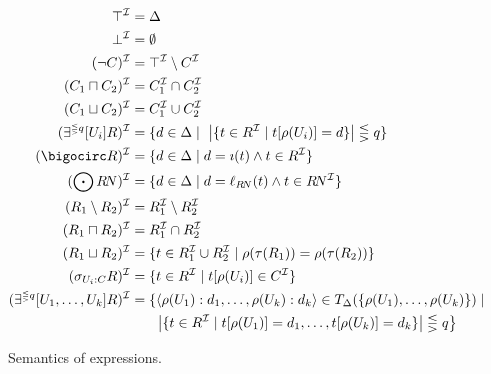 \documentclass[envcountsame,draft]{llncs}
\newcommand{\greif}[1]{\ensuremath{\bigocirc#1}}
\newcommand{\lreif}[1]{\ensuremath{\bigodot#1}}
\newcommand{\Int}[1]{#1^{\Imc}\xspace}
\renewcommand\dom{\ensuremath{\Delta}\xspace}
\begin{document}
\begin{figure}[t] 
	\centering
		\begin{align*}
			\Int{\top} = {} & \dom\\
			\Int{\bot} = {} & \emptyset\\
			\Int{(\neg C)} = {} & \Int{\top} \setminus \Int{C}\\
			\Int{(C_{1}\sqcap C_{2})} = {} & \Int C_{1} \cap \Int C_{2}\\
			\Int{(C_{1}\sqcup C_{2})} = {} & \Int C_{1} \cup \Int C_{2}\\
			\Int{(\EXISTR{q}{U_i} R)} = {} & \{d\in\dom\mid~\left|\{t\in\Int R\mid t[\rho(U_i)]=d\}\right| \lesseqgtr q \}\\
			\Int{(\greif{R})} = {} & \{d\in \dom \mid d=\imath(t) \land t\in \Int{R}\}\\
			\Int{(\lreif{R\!N})} = {} & \{d\in \dom \mid d=\ell_{R\!N}(t)\land t\in \Int{R\!N}\}\\
			\Int{(R_1\setminus R_2)} = {} & \Int R_{1} \setminus \Int R_{2}\\
			\Int{(R_{1}\sqcap R_{2})} = {} & \Int R_{1} \cap \Int R_{2}\\
			\Int{(R_{1}\sqcup R_{2})} = {} & \{t\in\Int R_{1}\cup\Int R_{2}\mid \rho(\tau(R_1))= \rho(\tau(R_2))\}\\
			\Int{(\selects {U_i}{C}{R})} = {} & \{t\in\Int{R} \mid t[\rho(U_i)]\in\Int{C}\}  \\
			\Int{(\EXISTR{q}{U_1,\ldots,U_k} R)} = {} & 
					\{ \langle \rho(U_1):d_1,\ldots,\rho(U_k):d_k\rangle \in T_{\dom}(\{\rho(U_1),\ldots,\rho(U_k)\}) \mid {}  \\ & \ 
			\left. \left|\{t\in\Int R \mid t[\rho(U_1)]=d_1,\ldots,t[\rho(U_k)]=d_k\}\right| \lesseqgtr q \right\}
		\end{align*}
	\caption{\label{fig:sem:dlrp} Semantics of \DLRp expressions.} 
\end{figure}
\end{document}
